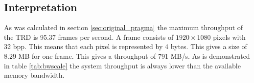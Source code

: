 \subsection{Interpretation}
As was calculated in section \ref{sec:original_pragma} the maximum throughput of the TRD is 95.37 frames per second. A frame consists of  $1920\times1080$ pixels  with 32 bpp. This means that each pixel is represented by 4 bytes. This gives a size of 8.29 MB for one frame. This gives a throughput of 791 MB/s. As is demonstrated in table \ref{tab:bwscale} the system throughput is always lower than the available memory bandwidth.



